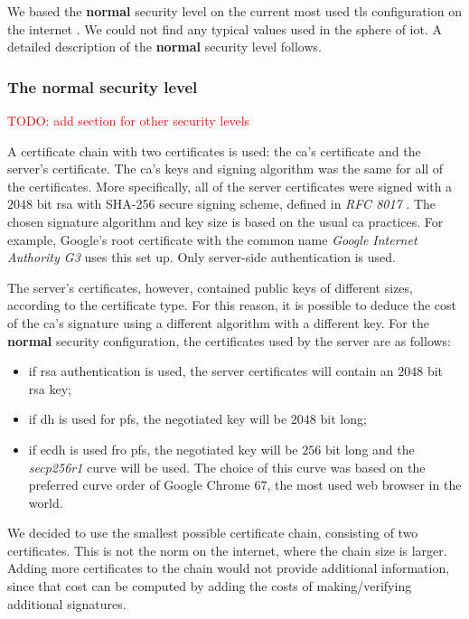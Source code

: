 \documentclass{llncs}
\newcommand{\todo}[1]{\textcolor{red}{TODO: #1}\PackageWarning{TODO:}{#1!}}
\begin{document}
We based the \textbf{normal} security level on the current most used \gls{tls} configuration on the internet \cite{QualysSS90:online}.
We could not find any typical values used in the sphere of \gls{iot}. A detailed description of the \textbf{normal} security level follows.

\subsubsection{The normal security level}

\todo{add section for other security levels}

A certificate chain with two certificates is used: the \gls{ca}'s certificate
and the server's certificate. The \gls{ca}'s keys and signing 
algorithm was the same for all of the certificates. More specifically, all of the server certificates were 
signed with a $2048$ bit \gls{rsa} with SHA-256 secure signing scheme, defined in \textit{RFC 8017} \cite{RFC8017}. 
The chosen signature algorithm and key size is based on the usual \gls{ca} practices. For example, 
Google's root certificate with the common name \textit{Google Internet Authority G3} uses this set up.
Only server-side authentication is used.

The server's certificates, however, contained public keys of different sizes, according to the certificate type.
For this reason, it is possible to deduce the cost of the \gls{ca}'s signature using a different algorithm with a
different key. For the \textbf{normal} security configuration, the certificates used by the server are as follows:

\begin{itemize}
  \item if \gls{rsa} authentication is used, the server certificates will contain an $2048$ bit \gls{rsa} key;
  \item if \gls{dh} is used for \gls{pfs}, the negotiated key will be $2048$ bit long;
  \item if \gls{ecdh} is used fro \gls{pfs}, the negotiated key will be $256$ bit long and the \textit{secp256r1}
  curve will be used. The choice of this curve was based on the preferred curve order of Google Chrome $67$, the most
  used web browser in the world\cite{BrowserS4:online}.
\end{itemize}

We decided to use the smallest possible certificate chain, consisting of two certificates. This is not the norm
on the internet, where the chain size is larger. Adding more certificates to the chain would not provide additional
information, since that cost can be computed by adding the costs of making/verifying additional signatures.
\end{document}
